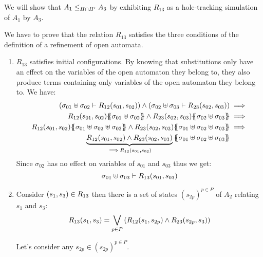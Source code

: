 \documentclass[runningheads]{llncs}
\begin{document}
We will show that $\wrel{A_1}{A_3}{H\cap H'}$ by exhibiting  $R_{13}$ as a hole-tracking simulation of $A_1$ by  $A_3$.

We have to prove that the relation $R_{13}$ satisfies the three conditions of the definition of a refinement of open automata.
\begin{enumerate}
\item $R_{13}$ satisfies initial configurations. By knowing that substitutions only have an effect on the variables of the open automaton they belong to, they also produce terms containing only variables of the open automaton they belong to. We have:
\begin{align*}
\mpar{\sigma_{01} \uplus \sigma_{02} \vdash R_{12}\mpar{s_{01}, s_{02}}} \wedge \mpar
{\sigma_{02} \uplus \sigma_{03} \vdash R_{23}\mpar{s_{02}, s_{03}}}&\implies\\
R_{12}\mpar{s_{01},s_{02}}\psubst{\sigma_{01} \uplus \sigma_{02}} \wedge R_{23}\mpar{s_{02}, s_{03}}\psubst{\sigma_{02} \uplus \sigma_{03}}&\implies\\
R_{12}\mpar{s_{01},s_{02}}\psubst{\sigma_{01} \uplus \sigma_{02} \uplus \sigma_{03}} \wedge R_{23}\mpar{s_{02}, s_{03}}\psubst{\sigma_{01} \uplus \sigma_{02} \uplus \sigma_{03}}&\implies\\ 
\underbrace{R_{12}\mpar{s_{01},s_{02}}\wedge R_{23}\mpar{s_{02}, s_{03}}}_{\implies R_{13} \mpar{s_{01}, s_{03}}}\psubst{\sigma_{01} \uplus \sigma_{02} \uplus \sigma_{03}} %
 \end{align*}
Since $\sigma_{02}$ has no effect on variables of $s_{01}$ and $s_{03}$ thus we get:
\[\sigma_{01} \uplus \sigma_{03} \vdash R_{13} \mpar{s_{01}, s_{03}}\]
\item Consider $\mpar{s_{1}, s_{3}} \in R_{13}$ then there is a set of states $(s_{2p})^{p\in P}$ of $A_2$ relating  $s_{1}$ and $s_{3}$:
\[R_{13}(s_1,s_3)=\bigvee_{{p\in P}
}\mpar{R_{12}\mpar{s_1,s_{2p}} \wedge R_{23}\mpar{s_{2p},s_3}} \]

Let's consider any $s_{2p} \in (s_{2p})^{p\in P}$.


\end{enumerate}
\end{document}
